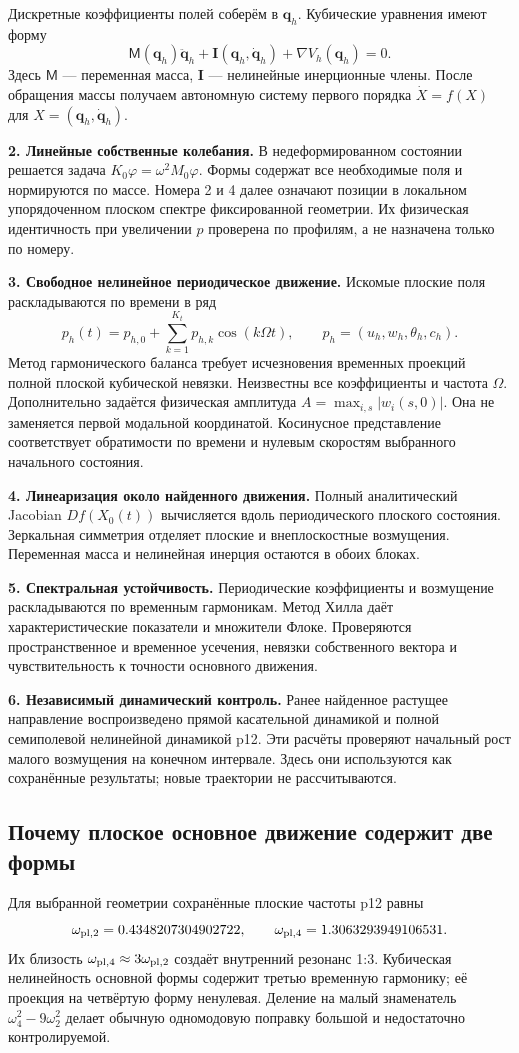 \documentclass[11pt,a4paper]{article}
\begin{document}
Дискретные коэффициенты полей соберём в $\mathbf q_h$. Кубические уравнения имеют форму
\[
\mathsf M(\mathbf q_h)\ddot{\mathbf q}_h+
\mathbf I(\mathbf q_h,\dot{\mathbf q}_h)+\nabla V_h(\mathbf q_h)=0.
\]
Здесь $\mathsf M$ --- переменная масса, $\mathbf I$ --- нелинейные инерционные члены. После обращения массы получаем автономную систему первого порядка $\dot X=f(X)$ для $X=(\mathbf q_h,\dot{\mathbf q}_h)$.

\textbf{2. Линейные собственные колебания.} В недеформированном состоянии решается задача $K_0\varphi=\omega^2M_0\varphi$. Формы содержат все необходимые поля и нормируются по массе. Номера 2 и 4 далее означают позиции в локальном упорядоченном плоском спектре фиксированной геометрии. Их физическая идентичность при увеличении $p$ проверена по профилям, а не назначена только по номеру.

\textbf{3. Свободное нелинейное периодическое движение.} Искомые плоские поля раскладываются по времени в ряд
\[
p_h(t)=p_{h,0}+\sum_{k=1}^{K_t}p_{h,k}\cos(k\Omega t),
\qquad p_h=(u_h,w_h,\theta_h,c_h).
\]
Метод гармонического баланса требует исчезновения временных проекций полной плоской кубической невязки. Неизвестны все коэффициенты и частота $\Omega$. Дополнительно задаётся физическая амплитуда $A=\max_{i,s}|w_i(s,0)|$. Она не заменяется первой модальной координатой. Косинусное представление соответствует обратимости по времени и нулевым скоростям выбранного начального состояния.

\textbf{4. Линеаризация около найденного движения.} Полный аналитический Jacobian $Df(X_0(t))$ вычисляется вдоль периодического плоского состояния. Зеркальная симметрия отделяет плоские и внеплоскостные возмущения. Переменная масса и нелинейная инерция остаются в обоих блоках.

\textbf{5. Спектральная устойчивость.} Периодические коэффициенты и возмущение раскладываются по временным гармоникам. Метод Хилла даёт характеристические показатели и множители Флоке. Проверяются пространственное и временное усечения, невязки собственного вектора и чувствительность к точности основного движения.

\textbf{6. Независимый динамический контроль.} Ранее найденное растущее направление воспроизведено прямой касательной динамикой и полной семиполевой нелинейной динамикой p12. Эти расчёты проверяют начальный рост малого возмущения на конечном интервале. Здесь они используются как сохранённые результаты; новые траектории не рассчитываются.

\subsection{Почему плоское основное движение содержит две формы}
Для выбранной геометрии сохранённые плоские частоты p12 равны
\[
\omega_{{\rm pl},2}=0.4348207304902722,\qquad
\omega_{{\rm pl},4}=1.3063293949106531.
\]
Их близость $\omega_{{\rm pl},4}\approx3\omega_{{\rm pl},2}$ создаёт внутренний резонанс 1:3. Кубическая нелинейность основной формы содержит третью временную гармонику; её проекция на четвёртую форму ненулевая. Деление на малый знаменатель $\omega_4^2-9\omega_2^2$ делает обычную одномодовую поправку большой и недостаточно контролируемой.
\end{document}
